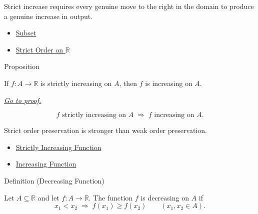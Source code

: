 \begin{remark*}[Interpretation]
Strict increase requires every genuine move to the right in the domain to
produce a genuine increase in output.
\end{remark*}

\begin{dependencies}
\begin{itemize}
  \item \hyperref[def:subset]{Subset}
  \item \hyperref[def:strict-order-on-r]{Strict Order on $\mathbb{R}$}
\end{itemize}
\end{dependencies}

\begin{propositionbox}{Proposition}
\begin{proposition}
\label{prop:strictly-increasing-implies-increasing}
If \(f:A\to\mathbb{R}\) is strictly increasing on \(A\), then \(f\) is
increasing on \(A\).

\smallskip\noindent
\hyperref[prf:strictly-increasing-implies-increasing]{\textit{Go to proof.}}
\end{proposition}
\end{propositionbox}

\begin{remark*}
\[
  f\text{ strictly increasing on }A
  \;\Longrightarrow\;
  f\text{ increasing on }A.
\]
\end{remark*}

\begin{remark*}[Interpretation]
Strict order preservation is stronger than weak order preservation.
\end{remark*}

\begin{dependencies}
\begin{itemize}
  \item \hyperref[def:function-strictly-increasing]{Strictly Increasing Function}
  \item \hyperref[def:function-increasing]{Increasing Function}
\end{itemize}
\end{dependencies}

\begin{definitionbox}{Definition (Decreasing Function)}
\begin{definition}
\label{def:function-decreasing}
Let $A\subseteq\mathbb{R}$ and let $f:A\to\mathbb{R}$.  The function
$f$ is decreasing on $A$ if
\[
  x_1<x_2\;\Longrightarrow\;f(x_1)\geq f(x_2)
  \qquad (x_1,x_2\in A).
\]
\end{definition}
\end{definitionbox}


